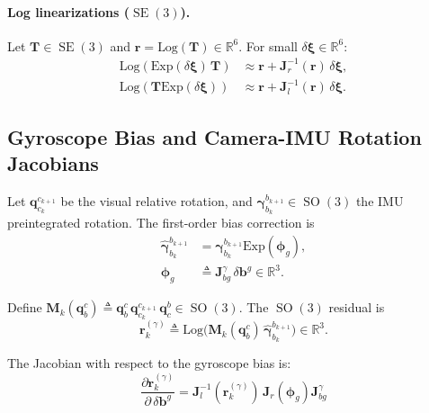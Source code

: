 \paragraph{Log linearizations ($\operatorname{SE}(3)$).}
Let $\mathbf{T}\in\operatorname{SE}(3)$ and $\mathbf{r}=\text{Log}(\mathbf{T})\in\mathbb{R}^6$.
For small $\delta\boldsymbol{\xi}\in\mathbb{R}^6$:
\begin{align}
\text{Log}(\text{Exp}(\delta\boldsymbol{\xi})\,\mathbf{T}) &\approx \mathbf{r} + \mathbf{J}_r^{-1}(\mathbf{r})\,\delta\boldsymbol{\xi},
\label{eq:maci2:log_leftmult_se3}\\
\text{Log}(\mathbf{T}\text{Exp}(\delta\boldsymbol{\xi})) &\approx \mathbf{r} + \mathbf{J}_l^{-1}(\mathbf{r})\,\delta\boldsymbol{\xi}.
\label{eq:maci2:log_rightmult_se3}
\end{align}


\subsection{Gyroscope Bias and Camera-IMU Rotation Jacobians}

Let $\mathbf{q}_{c_k}^{c_{k+1}}$ be the visual relative rotation, and
$\boldsymbol{\gamma}_{b_k}^{b_{k+1}}\in\operatorname{SO}(3)$ the IMU preintegrated rotation.
The first-order bias correction is
\begin{equation}
\begin{aligned}
\hat{\boldsymbol{\gamma}}_{b_k}^{b_{k+1}}
&=
\boldsymbol{\gamma}_{b_k}^{b_{k+1}}\text{Exp}(\boldsymbol{\phi}_g),\\
\boldsymbol{\phi}_g &\triangleq \mathbf{J}_{bg}^\gamma\,\delta\mathbf{b}^g \in \mathbb{R}^3.
\end{aligned}
\end{equation}

Define
$\mathbf{M}_k(\mathbf{q}_b^c) \triangleq
\mathbf{q}_b^c\,\mathbf{q}_{c_k}^{c_{k+1}}\,\mathbf{q}_c^b
\in \operatorname{SO}(3)$.
The $\operatorname{SO}(3)$ residual is
\begin{equation}
\mathbf{r}^{(\gamma)}_k
\triangleq
\text{Log}\!\Big(
\mathbf{M}_k(\mathbf{q}_b^c)\,\hat{\boldsymbol{\gamma}}_{b_k}^{b_{k+1}}
\Big)\in\mathbb{R}^3.
\end{equation}

The Jacobian with respect to the gyroscope bias is:
\begin{equation}
\frac{\partial \mathbf{r}^{(\gamma)}_k}{\partial\,\delta\mathbf{b}^g}
=
\mathbf{J}_l^{-1}(\mathbf{r}^{(\gamma)}_k)\,
\mathbf{J}_r(\boldsymbol{\phi}_g) \mathbf{J}_{bg}^\gamma
\end{equation}

